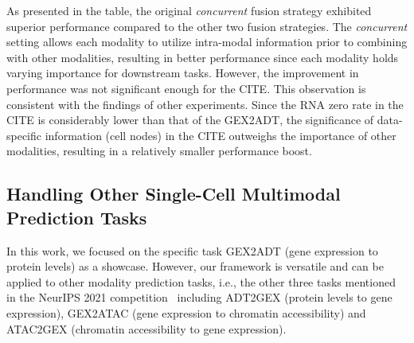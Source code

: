 \begin{table}[h]
\centering
\vspace{-0.5em}
\caption{The prediction RMSEs for different Fusion strategies.}\label{tab:fusion}
\vspace{-1.2em}
\vspace{-1.2em}
\end{table}

As presented in the table, the original \textit{concurrent} fusion strategy exhibited superior performance compared to the other two fusion strategies. The \textit{concurrent} setting allows each modality to utilize intra-modal information prior to combining with other modalities, resulting in better performance since each modality holds varying importance for downstream tasks. However, the improvement in performance was not significant enough for the CITE. This observation is consistent with the findings of other experiments. Since the RNA zero rate in the CITE is considerably lower than that of the GEX2ADT, the significance of data-specific information (cell nodes) in the CITE outweighs the importance of other modalities, resulting in a relatively smaller performance boost.

\subsection{Handling Other Single-Cell Multimodal Prediction Tasks}

In this work, we focused on the specific task GEX2ADT (gene expression to protein levels) as a showcase. However, our framework is versatile and can be applied to other modality prediction tasks, i.e., the other three tasks mentioned in the NeurIPS 2021 competition~\cite{luecken2021sandbox} including ADT2GEX (protein levels to gene expression), GEX2ATAC (gene expression to chromatin accessibility) and ATAC2GEX (chromatin accessibility to gene expression). 

